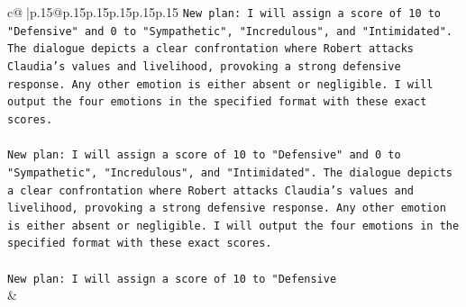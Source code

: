 \documentclass{article}
\begin{document}
{\begin{supertabular}{c@{$\;$}|p{.15\linewidth}@{}p{.15\linewidth}p{.15\linewidth}p{.15\linewidth}p{.15\linewidth}p{.15\linewidth}}
{{{\texttt{New plan: I will assign a score of 10 to "Defensive" and 0 to "Sympathetic", "Incredulous", and "Intimidated". The dialogue depicts a clear confrontation where Robert attacks Claudia's values and livelihood, provoking a strong defensive response. Any other emotion is either absent or negligible. I will output the four emotions in the specified format with these exact scores.} \\
\\ 
\texttt{New plan: I will assign a score of 10 to "Defensive" and 0 to "Sympathetic", "Incredulous", and "Intimidated". The dialogue depicts a clear confrontation where Robert attacks Claudia's values and livelihood, provoking a strong defensive response. Any other emotion is either absent or negligible. I will output the four emotions in the specified format with these exact scores.} \\
\\ 
\texttt{New plan: I will assign a score of 10 to "Defensive} \\
            }
        }
    }
    & \\ \\

\end{supertabular}
}
\end{document}
